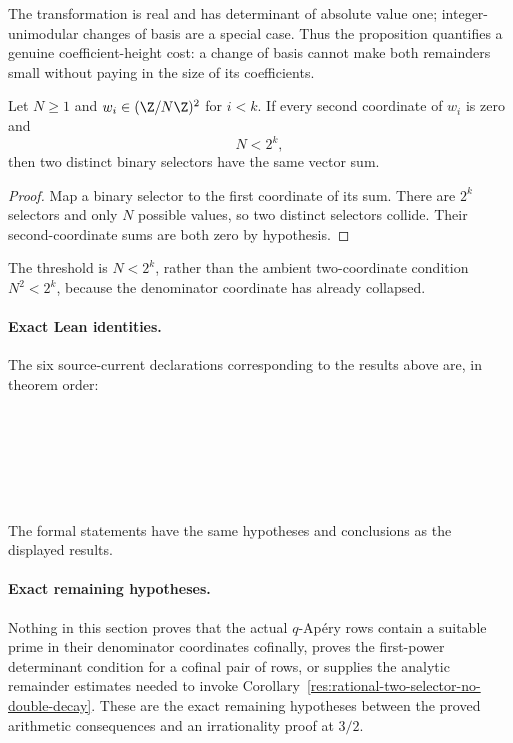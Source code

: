 The transformation is real and has determinant of absolute value one;
integer-unimodular changes of basis are a special case.  Thus the proposition
quantifies a genuine coefficient-height cost: a change of basis cannot make
both remainders small without paying in the size of its coefficients.

\begin{proposition}
\label{res:zero-denominator-selector-collision}
Let \(N\ge1\) and \(w_i\in(\Z/N\Z)^2\) for \(i<k\).  If every second
coordinate of \(w_i\) is zero and
\[
 N<2^k,
\]
then two distinct binary selectors have the same vector sum.
\end{proposition}

\begin{proof}
Map a binary selector to the first coordinate of its sum.  There are \(2^k\)
selectors and only \(N\) possible values, so two distinct selectors collide.
Their second-coordinate sums are both zero by hypothesis.
\end{proof}

The threshold is \(N<2^k\), rather than the ambient two-coordinate condition
\(N^2<2^k\), because the denominator coordinate has already collapsed.

\paragraph{Exact Lean identities.}
The six source-current declarations corresponding to the results above are,
in theorem order:
\begin{flushleft}\small
{}\\
\\
\\
\\
\\
\end{flushleft}
The formal statements have the same hypotheses and conclusions as the
displayed results.

\paragraph{Exact remaining hypotheses.}
\label{bdry:prime-support-remaining-hypotheses}
Nothing in this section proves that the actual \(q\)-Ap\'ery rows contain a
suitable prime in their denominator coordinates cofinally, proves the
first-power determinant condition for a cofinal pair of rows, or supplies the
analytic remainder estimates needed to invoke
Corollary~\ref{res:rational-two-selector-no-double-decay}.  These are the exact
remaining hypotheses between the proved arithmetic consequences and an
irrationality proof at \(3/2\).

